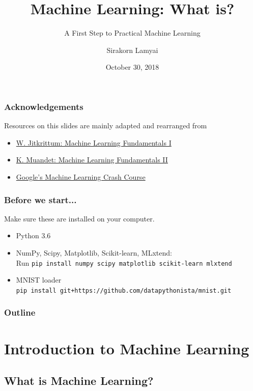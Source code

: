 \documentclass[aspectratio=169]{beamer}
\title{Machine Learning: What is?}
\subtitle{A First Step to Practical Machine Learning}
\author{Sirakorn Lamyai}
\institute{Student, Kasetsart U.}
\date{October 30, 2018}
\begin{document}
\begin{frame}
	\titlepage
\end{frame}

\begin{frame}
	\frametitle{Acknowledgements}
	Resources on this slides are mainly adapted and rearranged from
	\begin{itemize}
		\item \href{https://docs.google.com/presentation/d/1oGIyzoMHT3-TTS23NPL-qzh0EAXb6kyK0S_1n5MjmgQ/edit\#slide=id.p}{W. Jitkrittum: Machine Learning Fundamentals I}
		\item \href{http://krikamol.org/tutorial/slides/vistec-talk-16-March-2018.pdf}{K. Muandet: Machine Learning Fundamentals II}
		\item \href{https://developers.google.com/machine-learning/crash-course/}{Google's Machine Learning Crash Course}
	\end{itemize}
\end{frame}

\begin{frame}
	\frametitle{Before we start...}
	Make sure these are installed on your computer.\\

	\begin{itemize}
		\item Python 3.6
		\item NumPy, Scipy, Matplotlib, Scikit-learn, MLxtend:\\
			  Run \texttt{pip install numpy scipy matplotlib scikit-learn mlxtend}
		\item MNIST loader\\
			  \texttt{pip install git+https://github.com/datapythonista/mnist.git}
	\end{itemize}
\end{frame}

\begin{frame}
	\frametitle{Outline}
	\begin{multicols}{2}
		\tableofcontents
	\end{multicols}
\end{frame}

\section{Introduction to Machine Learning}

\subsection{What is Machine Learning?}
\end{document}
